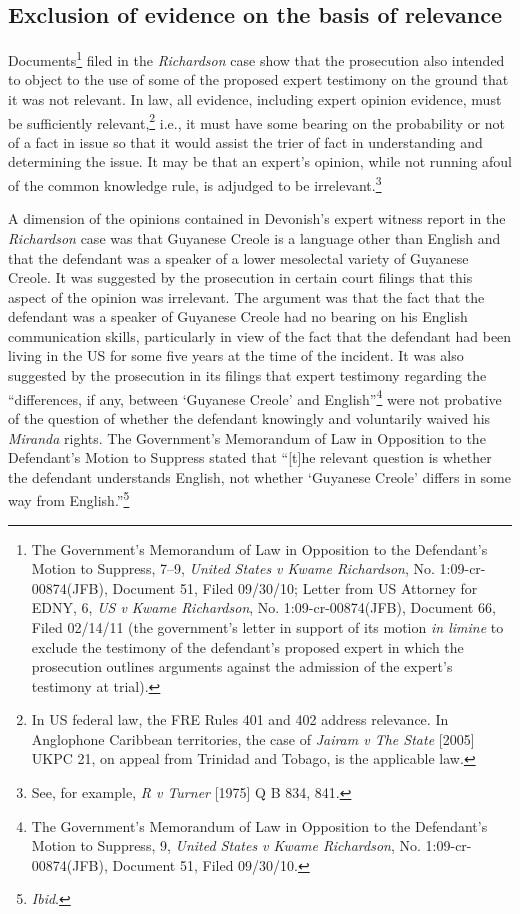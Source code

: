 \documentclass[output=paper,colorlinks,citecolor=brown]{langscibook}
\begin{document}
\subsection{Exclusion of evidence on the basis of relevance}

Documents\footnote{The Government’s Memorandum of Law in Opposition to the Defendant’s Motion to Suppress, 7--9, \emph{United States v Kwame Richardson}, No. 1:09-cr-00874(JFB), Document 51, Filed 09/30/10; Letter from US Attorney for EDNY, 6, \emph{US v Kwame Richardson}, No. 1:09-cr-00874(JFB), Document 66, Filed 02/14/11 (the government’s letter in support of its motion \emph{in limine} to exclude the testimony of the defendant’s proposed expert in which the prosecution outlines arguments against the admission of the expert’s testimony at trial).} filed in the \emph{Richardson} case show that the prosecution also intended to object to the use of some of the proposed expert testimony on the ground that it was not relevant. In law, all evidence, including expert opinion evidence, must be sufficiently relevant,\footnote{In US federal law, the FRE Rules 401 and 402 address relevance. In Anglophone Caribbean territories, the case of \emph{Jairam v The State} [2005] UKPC 21, on appeal from Trinidad and Tobago, is the applicable law.} i.e., it must have some bearing on the probability or not of a fact in issue so that it would assist the trier of fact in understanding and determining the issue. It may be that an expert’s opinion, while not running afoul of the common knowledge rule, is adjudged to be irrelevant.\footnote{See, for example, \emph{R v Turner} [1975] Q B 834, 841.}  

A dimension of the opinions contained in Devonish’s expert witness report in the \emph{Richardson} case was that Guyanese Creole is a language other than English and that the defendant was a speaker of a lower mesolectal variety of Guyanese Creole. It was suggested by the prosecution in certain court filings that this aspect of the opinion was irrelevant. The argument was that the fact that the defendant was a speaker of Guyanese Creole had no bearing on his English communication skills, particularly in view of the fact that the defendant had been living in the US for some five years at the time of the incident. It was also suggested by the prosecution in its filings that expert testimony regarding the “differences, if any, between ‘Guyanese Creole’ and English”\footnote{The Government’s Memorandum of Law in Opposition to the Defendant’s Motion to Suppress, 9, \emph{United States v Kwame Richardson}, No. 1:09-cr-00874(JFB), Document 51, Filed 09/30/10.} were not probative of the question of whether the defendant knowingly and voluntarily waived his \textit{Miranda} rights. The Government’s Memorandum of Law in Opposition to the Defendant’s Motion to Suppress stated that “[t]he relevant question is whether the defendant understands English, not whether ‘Guyanese Creole’ differs in some way from English.”\footnote{\emph{Ibid}.} 
\end{document}
